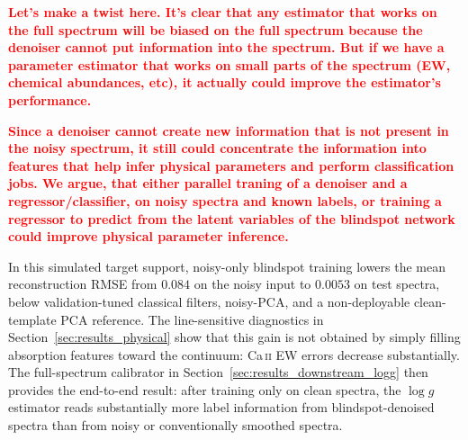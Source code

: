 \documentclass[twocolumn]{aastex7}
\newcommand{\ld}[1]{\textcolor{red}{\textbf{#1}}}
\begin{document}
\ld{Let's make a twist here. It's clear that any estimator that works on the full spectrum will be biased on the full spectrum because the denoiser cannot put information into the spectrum. But if we have a parameter estimator that works on small parts of the spectrum (EW, chemical abundances, etc), it actually could improve the estimator's performance.}

\ld{Since a denoiser cannot create new information that is not present in the noisy spectrum, it still could concentrate the information into features that help infer physical parameters and perform classification jobs. We argue, that either parallel traning of a denoiser and a regressor/classifier, on noisy spectra and known labels, or training a regressor to predict from the latent variables of the blindspot network could improve physical parameter inference.}

In this simulated target support, noisy-only blindspot training lowers the mean reconstruction RMSE from $0.084$ on the noisy input to $0.0053$ on test spectra, below validation-tuned classical filters, noisy-PCA, and a non-deployable clean-template PCA reference. The line-sensitive diagnostics in Section~\ref{sec:results_physical} show that this gain is not obtained by simply filling absorption features toward the continuum: Ca\,\textsc{ii} EW errors decrease substantially. The full-spectrum calibrator in Section~\ref{sec:results_downstream_logg} then provides the end-to-end result: after training only on clean spectra, the $\log g$ estimator reads substantially more label information from blindspot-denoised spectra than from noisy or conventionally smoothed spectra.
\end{document}
